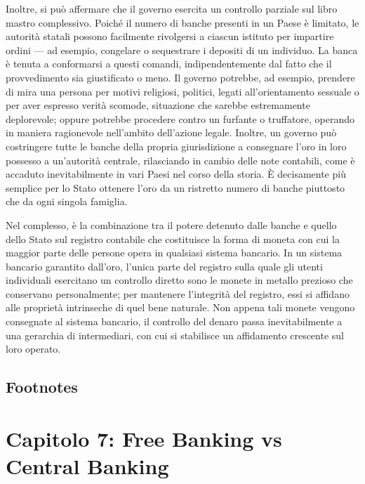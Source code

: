 \documentclass[
  a5paper,
  smalldemyvopaper,10pt,twoside,onecolumn,openright,extrafontsizes,hidelinks]{memoir}
\begin{document}
Inoltre, si può affermare che il governo esercita un controllo parziale
sul libro mastro complessivo. Poiché il numero di banche presenti in un
Paese è limitato, le autorità statali possono facilmente rivolgersi a
ciascun istituto per impartire ordini --- ad esempio, congelare o
sequestrare i depositi di un individuo. La banca è tenuta a conformarsi
a questi comandi, indipendentemente dal fatto che il provvedimento sia
giustificato o meno. Il governo potrebbe, ad esempio, prendere di mira
una persona per motivi religiosi, politici, legati all'orientamento
sessuale o per aver espresso verità scomode, situazione che sarebbe
estremamente deplorevole; oppure potrebbe procedere contro un furfante o
truffatore, operando in maniera ragionevole nell'ambito dell'azione
legale. Inoltre, un governo può costringere tutte le banche della
propria giurisdizione a consegnare l'oro in loro possesso a un'autorità
centrale, rilasciando in cambio delle note contabili, come è accaduto
inevitabilmente in vari Paesi nel corso della storia. È decisamente più
semplice per lo Stato ottenere l'oro da un ristretto numero di banche
piuttosto che da ogni singola famiglia.

Nel complesso, è la combinazione tra il potere detenuto dalle banche e
quello dello Stato sul registro contabile che costituisce la forma di
moneta con cui la maggior parte delle persone opera in qualsiasi sistema
bancario. In un sistema bancario garantito dall'oro, l'unica parte del
registro sulla quale gli utenti individuali esercitano un controllo
diretto sono le monete in metallo prezioso che conservano personalmente;
per mantenere l'integrità del registro, essi si affidano alle proprietà
intrinseche di quel bene naturale. Non appena tali monete vengono
consegnate al sistema bancario, il controllo del denaro passa
inevitabilmente a una gerarchia di intermediari, con cui si stabilisce
un affidamento crescente sul loro operato.

\section{Footnotes}\label{footnotes-6}


\chapter{\texorpdfstring{Capitolo 7: \textbf{Free Banking vs Central
Banking}}{Capitolo 7: Free Banking vs Central Banking}}\label{capitolo-7-free-banking-vs-central-banking}
\end{document}
